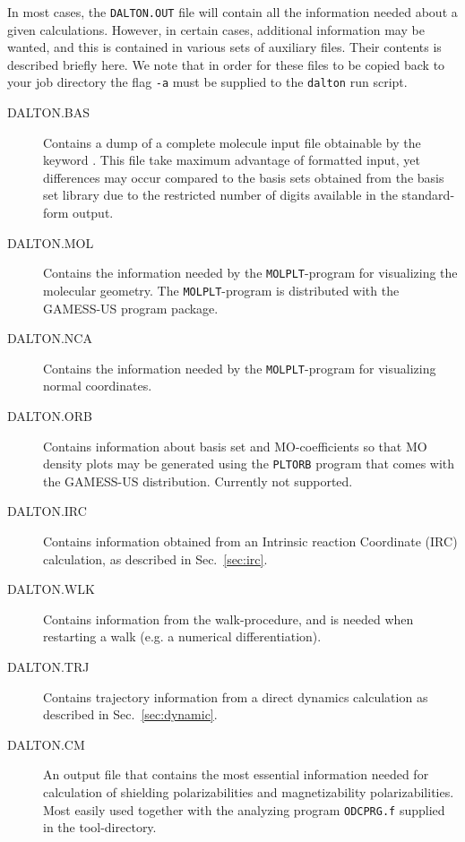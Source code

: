 In most cases, the \verb|DALTON.OUT| file will contain all the
information needed about a given calculations. However, in certain
cases, additional information may be wanted, and this is contained
in various sets of auxiliary files. Their contents is described
briefly here. We note that in order for these files to be copied
back to your job directory the flag \verb|-a| must be supplied to
the \verb|dalton| run script.

\begin{description}
\item[DALTON.BAS] Contains a dump of a complete molecule input file
obtainable by the keyword . This file take maximum
advantage of formatted input, yet differences may occur compared to
the basis sets obtained from the basis set library due to the
restricted number of digits available in the standard-form output.

\item[DALTON.MOL] Contains the information needed by the
\verb|MOLPLT|-program for visualizing the molecular geometry. The
\verb|MOLPLT|-program is distributed with the GAMESS-US program
package.

\item[DALTON.NCA] Contains the information needed by the
\verb|MOLPLT|-program for visualizing normal coordinates.

\item[DALTON.ORB] Contains information about basis set and
MO-coefficients so that MO density plots may be generated using the
\verb|PLTORB| program that comes with the GAMESS-US
distribution. Currently not supported.

\item[DALTON.IRC] Contains information obtained from an Intrinsic
reaction Coordinate (IRC) calculation, as described in
Sec.~\ref{sec:irc}.

\item[DALTON.WLK] Contains information from the walk-procedure, and is
needed when restarting a walk (e.g. a numerical differentiation).

\item[DALTON.TRJ] Contains trajectory information from a direct
dynamics calculation as described in
Sec.~\ref{sec:dynamic}.

\item[DALTON.CM] An output file that contains the most essential
information needed for calculation of shielding polarizabilities
and magnetizability polarizabilities. Most easily used together
with the analyzing program \verb|ODCPRG.f| supplied in
the
tool-directory.


\end{description}
